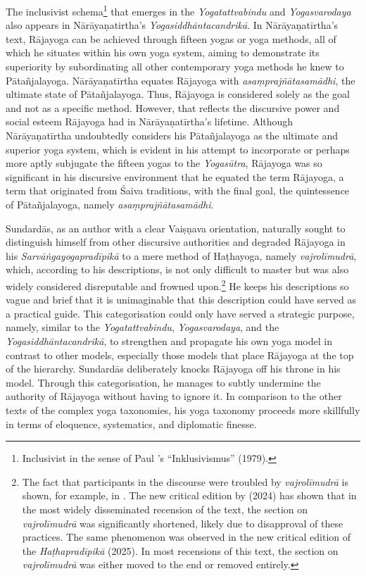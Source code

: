 The inclusivist schema\footnote{Inclusivist in the sense of Paul \citeauthor{hacker1979}'s ``Inklusivismus'' (1979).} that emerges in the \emph{Yogatattvabindu} and \emph{Yogasvarodaya} also appears in Nārāyaṇatirtha's \textit{Yogasiddhāntacandrikā}. In Nārāyaṇatīrtha's text, Rājayoga can be achieved through fifteen yogas or yoga methods, all of which he situates within his own yoga system, aiming to demonstrate its superiority by subordinating all other contemporary yoga methods he knew to Pātañjalayoga. Nārāyaṇatīrtha equates Rājayoga with \textit{asaṃprajñātasamādhi}, the ultimate state of Pātañjalayoga. Thus, Rājayoga is considered solely as the goal and not as a specific method. However, that reflects the discursive power and social esteem Rājayoga had in Nārāyaṇatīrtha's lifetime. Although Nārāyaṇatīrtha undoubtedly considers his Pātañjalayoga as the ultimate and superior yoga system, which is evident in his attempt to incorporate or perhaps more aptly subjugate the fifteen yogas to the \textit{Yogasūtra}, Rājayoga was so significant in his discursive environment that he equated the term Rājayoga, a term that originated from Śaiva traditions, with the final goal, the quintessence of Pātañjalayoga, namely \textit{asaṃprajñātasamādhi}.

Sundardās, as an author with a clear Vaiṣṇava orientation, naturally sought to distinguish himself from other discursive authorities and degraded Rājayoga in his \emph{Sarvāṅgayogapradīpikā} to a mere method of Haṭhayoga, namely \textit{vajrolīmudrā}, which, according to his descriptions, is not only difficult to master but was also widely considered disreputable and frowned upon.\footnote{The fact that participants in the discourse were troubled by \textit{vajrolīmudrā} is shown, for example, in \citeauthor{datta2024}. The new critical edition by \citeauthor{datta2024} (2024) has shown that in the most widely disseminated recension of the text, the section on \textit{vajrolīmudrā} was significantly shortened, likely due to disapproval of these practices. The same phenomenon was observed in the new critical edition of the \emph{Haṭhapradīpikā} (2025). In most recensions of this text, the section on \emph{vajrolīmudrā} was either moved to the end or removed entirely.} He keeps his descriptions so vague and brief that it is unimaginable that this description could have served as a practical guide. This categorisation could only have served a strategic purpose, namely, similar to the \emph{Yogatattvabindu}, \emph{Yogasvarodaya}, and the \textit{Yogasiddhāntacandrikā}, to strengthen and propagate his own yoga model in contrast to other models, especially those models that place Rājayoga at the top of the hierarchy. Sundardās deliberately knocks Rājayoga off his throne in his model. Through this categorisation, he manages to subtly undermine the authority of Rājayoga without having to ignore it. In comparison to the other texts of the complex yoga taxonomies, his yoga taxonomy proceeds more skillfully in terms of eloquence, systematics, and diplomatic finesse.

